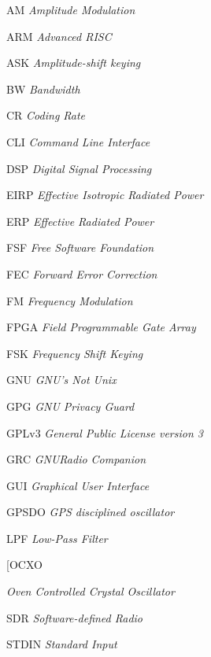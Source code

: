 \documentclass[
  12pt,				%
  openright,			%
  twoside,			%
  a4paper,			%
  english,			%
  french,				%
  spanish,			%
  brazil,				%
  ]{abntex2}
\begin{document}
\listoffigures*
\cleardoublepage

\listoftables*
\cleardoublepage

\begin{siglas}
  \item[AM]         \textit{Amplitude Modulation}
  \item[ARM]        \textit{Advanced RISC}
  \item[ASK]        \textit{Amplitude-shift keying}
  \item[BW]         \textit{Bandwidth}
  \item[CR]         \textit{Coding Rate}
  \item[CLI]        \textit{Command Line Interface}
  \item[DSP]        \textit{Digital Signal Processing}
  \item[EIRP]       \textit{Effective Isotropic Radiated Power}
  \item[ERP]        \textit{Effective Radiated Power}
  \item[FSF]        \textit{Free Software Foundation}
  \item[FEC]        \textit{Forward Error Correction}
  \item[FM]         \textit{Frequency Modulation}
  \item[FPGA]       \textit{Field Programmable Gate Array}
  \item[FSK]        \textit{Frequency Shift Keying}
  \item[GNU]        \textit{GNU's Not Unix}
  \item[GPG]        \textit{GNU Privacy Guard}
  \item[GPLv3]      \textit{General Public License version 3}
  \item[GRC]        \textit{GNURadio Companion}
  \item[GUI]        \textit{Graphical User Interface}
  \item[GPSDO]      \textit{GPS disciplined oscillator}
  \item[LPF         \textit{Low-Pass Filter}
  \item[OCXO]       \textit{Oven Controlled Crystal Oscillator}
  \item[SDR]        \textit{Software-defined Radio}
  \item[STDIN]      \textit{Standard Input}

\end{siglas}
\end{document}
